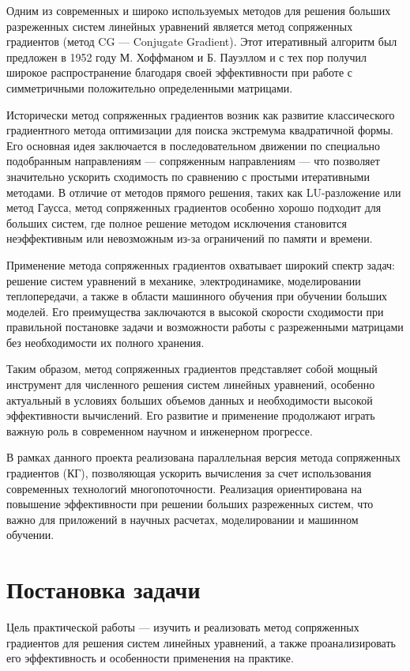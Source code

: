 \documentclass[12pt]{article}
\begin{document}
Одним из современных и широко используемых методов для решения больших разреженных систем линейных уравнений является метод сопряженных градиентов (метод CG — Conjugate Gradient). Этот итеративный алгоритм был предложен в 1952 году М. Хоффманом и Б. Пауэллом и с тех пор получил широкое распространение благодаря своей эффективности при работе с симметричными положительно определенными матрицами.

Исторически метод сопряженных градиентов возник как развитие классического градиентного метода оптимизации для поиска экстремума квадратичной формы. Его основная идея заключается в последовательном движении по специально подобранным направлениям — сопряженным направлениям — что позволяет значительно ускорить сходимость по сравнению с простыми итеративными методами. В отличие от методов прямого решения, таких как LU-разложение или метод Гаусса, метод сопряженных градиентов особенно хорошо подходит для больших систем, где полное решение методом исключения становится неэффективным или невозможным из-за ограничений по памяти и времени.

Применение метода сопряженных градиентов охватывает широкий спектр задач: решение систем уравнений в механике, электродинамике, моделировании теплопередачи, а также в области машинного обучения при обучении больших моделей. Его преимущества заключаются в высокой скорости сходимости при правильной постановке задачи и возможности работы с разреженными матрицами без необходимости их полного хранения.

Таким образом, метод сопряженных градиентов представляет собой мощный инструмент для численного решения систем линейных уравнений, особенно актуальный в условиях больших объемов данных и необходимости высокой эффективности вычислений. Его развитие и применение продолжают играть важную роль в современном научном и инженерном прогрессе.

В рамках данного проекта реализована параллельная версия метода сопряженных градиентов (КГ), позволяющая ускорить вычисления за счет использования современных технологий многопоточности. Реализация ориентирована на повышение эффективности при решении больших разреженных систем, что важно для приложений в научных расчетах, моделировании и машинном обучении.

\section{Постановка задачи}

\hspace*{1.25em}Цель практической работы — изучить и реализовать метод сопряженных градиентов для решения систем линейных уравнений, а также проанализировать его эффективность и особенности применения на практике.
\end{document}
